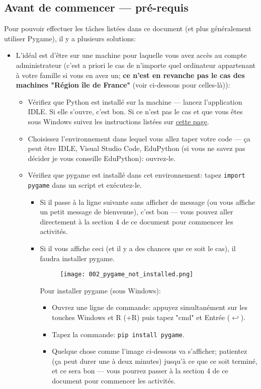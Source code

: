 \documentclass[11pt]{article}
\begin{document}
	\subsection*{Avant de commencer --- pré-requis}
	Pour pouvoir effectuer les tâches listées dans ce document (et plus généralement utiliser Pygame), il y a plusieurs solutions:
	\begin{itemize}
		\item L'idéal est d'être sur une machine pour laquelle vous avez accès au compte administrateur (c'est a priori le cas de n'importe quel ordinateur appartenant à votre famille si vous en avez un; \textbf{ce n'est en revanche pas le cas des machines "Région île de France"} (voir ci-dessous pour celles-là)):
		\begin{itemize}
			\item Vérifiez que Python est installé sur la machine --- lancez l'application IDLE. Si elle s'ouvre, c'est bon. Si ce n'est pas le cas et que vous êtes sous Windows suivez les instructions listées sur \href{https://docs.python.org/fr/3/using/windows.html#windows-full}{cette page}.
			\item Choisissez l'environnement dans lequel vous allez taper votre code --- ça peut être IDLE, Visual Studio Code, EduPython (si vous ne savez pas décider je vous conseille EduPython): ouvrez-le.
			\item Vérifiez que pygame est installé dans cet environnement: tapez \texttt{import pygame} dans un script et exécutez-le. 
			\begin{itemize}
				\item Si il passe à la ligne suivante sans afficher de message (ou vous affiche un petit message de bienvenue), c'est bon --- vous pouvez aller directement à la section 4 de ce document pour commencer les activités.
				\item Si il vous affiche ceci (et il y a des chances que ce soit le cas), il faudra installer pygame.
				
				\begin{figure}[H]
					\centering
					\texttt{[image: 002\_pygame\_not\_installed.png]}
				\end{figure}
				Pour installer pygame (sous Windows):
				\begin{itemize}
					\item Ouvrez une ligne de commande: appuyez simultanément sur les touches Windows et R (\faWindows \quad+\quad R) puis tapez "cmd" et Entrée ($\hookleftarrow$).
					\item Tapez la commande: \texttt{pip install pygame}.
					\item Quelque chose comme l'image ci-dessous va s'afficher; patientez (ça peut durer une à deux minutes) jusqu'à ce que ce soit terminé, et ce sera bon --- vous pourrez passer à la section 4 de ce document pour commencer les activités.
					

\end{itemize}
\end{itemize}
\end{itemize}
\end{itemize}
\end{document}
